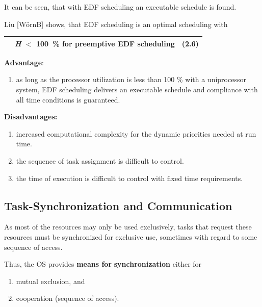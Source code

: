 It can be seen, that with EDF scheduling an executable schedule is found. 

Liu [W\"{o}rnB] shows, that EDF scheduling is an optimal scheduling with

\begin{tabular}{|p{0.3in}|p{3.9in}|p{0.4in}|} \hline 
 & \textit{ H} $\mathrm{<}$ 100~\%    for preemptive EDF scheduling & (2.6) \\ \hline 
\end{tabular}

\textbf{Advantage}: 

\begin{enumerate}
\item  as long as the processor utilization is less than 100 \% with a uniprocessor system, EDF  scheduling delivers an executable schedule and compliance with all time conditions is guaranteed.
\end{enumerate}

\textbf{Disadvantages:}

\begin{enumerate}
\item \textbf{ }increased computational complexity for the dynamic priorities needed at run time.

\item  the sequence of task assignment is difficult to control.

\item  the time of execution is difficult to control with fixed time requirements.
\end{enumerate}

\subsection{  Task-Synchronization and Communication}

As most of the resources may only be used exclusively, tasks that request these resources must be synchronized for exclusive use, sometimes with regard to some sequence of access. 

Thus, the OS provides \textbf{means for} \textbf{synchronization} either for 

\begin{enumerate}
\item  mutual exclusion, and 

\item  cooperation (sequence of access).
\end{enumerate}

